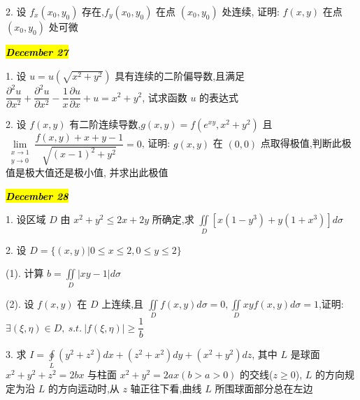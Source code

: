 2. 设 $f_{x}(x_{0},y_{0})$ 存在,$f_{y}(x_{0},y_{0})$ 在点 $(x_{0},y_{0})$ 处连续, 证明: $f(x,y)$ 在点 $(x_{0},y_{0})$ 处可微
\begin{solution}
	
\end{solution}

\hl{\textbf{\textit{December 27}}}

1. 设 $u=u(\sqrt{x^{2}+y^{2}})$ 具有连续的二阶偏导数,且满足 $\dfrac{\partial^{2} u}{\partial x^{2}}+\dfrac{\partial^{2} u}{\partial x^{2}}-\dfrac{1}{x}\dfrac{\partial u}{\partial x}+u=x^{2}+y^{2}$,
试求函数 $u$ 的表达式 
\begin{solution}
	
\end{solution}

2. 设 $f(x,y)$ 有二阶连续导数,$g(x,y)=f(e^{xy},x^{2}+y^{2})$ 且 $\lim\limits_{\substack{x\to 1\\ y\to 0}}\dfrac{f(x,y)+x+y-1}{\sqrt{(x-1)^{2}+y^{2}}}=0$,
证明: $g(x,y)$ 在 $(0,0)$ 点取得极值,判断此极值是极大值还是极小值, 并求出此极值
\begin{solution}
	
\end{solution}


\hl{\textbf{\textit{December 28}}}

1. 设区域 $D$ 由 $x^{2}+y^{2}\leq 2x+2y$ 所确定,求 $\displaystyle{\iint\limits_{D}[x(1-y^{3})+y(1+x^{3})]d\sigma}$
\begin{solution}
	
\end{solution}

2. 设 $D=\{(x,y)|0\leq x\leq 2,0\leq y\leq 2\}$

(1). 计算 $\displaystyle{b=\iint\limits_{D}|xy-1|d\sigma}$

(2). 设 $f(x,y)$ 在 $D$ 上连续,且 $\displaystyle{\iint\limits_{D}f(x,y)d\sigma=0,\iint\limits_{D}xyf(x,y)d\sigma=1}$,证明: $\exists (\xi,\eta)\in D,\ s.t.\ |f(\xi,\eta)|\geq \dfrac{1}{b}$
\begin{solution}
	
\end{solution}

3. 求 $\displaystyle{I=\oint\limits_{L}(y^{2}+z^{2})dx+(z^{2}+x^{2})dy+(x^{2}+y^{2})dz}$, 其中 $L$ 是球面 $x^{2}+y^{2}+z^{2}=2bx$ 与柱面 $x^{2}+y^{2}=2ax(b>a>0)$ 的交线($z\geq 0$),
$L$ 的方向规定为沿 $L$ 的方向运动时,从 $z$ 轴正往下看,曲线 $L$ 所围球面部分总在左边
\begin{solution}
	
\end{solution}

